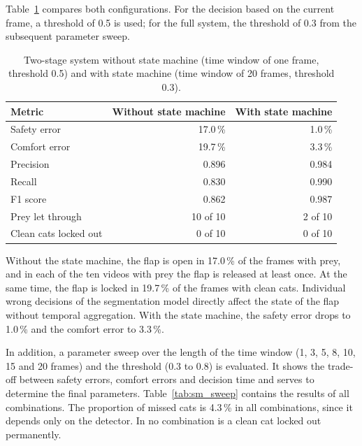 Table~\ref{tab:sm_ablation} compares both configurations. For the decision based on the current frame, a threshold of 0.5 is used; for the full system, the threshold of 0.3 from the subsequent parameter sweep.

\begin{table}[H]
    \centering
    \begin{tabular}{lrr}
        \toprule
        Metric & Without state machine & With state machine \\
        \midrule
        Safety error & 17.0\,\% & 1.0\,\% \\
        Comfort error & 19.7\,\% & 3.3\,\% \\
        Precision & 0.896 & 0.984 \\
        Recall & 0.830 & 0.990 \\
        F1 score & 0.862 & 0.987 \\
        Prey let through & 10 of 10 & 2 of 10 \\
        Clean cats locked out & 0 of 10 & 0 of 10 \\
        \bottomrule
    \end{tabular}
    \caption{Two-stage system without state machine (time window of one frame, threshold 0.5) and with state machine (time window of 20 frames, threshold 0.3).}
    \label{tab:sm_ablation}
\end{table}

Without the state machine, the flap is open in 17.0\,\% of the frames with prey, and in each of the ten videos with prey the flap is released at least once. At the same time, the flap is locked in 19.7\,\% of the frames with clean cats. Individual wrong decisions of the segmentation model directly affect the state of the flap without temporal aggregation. With the state machine, the safety error drops to 1.0\,\% and the comfort error to 3.3\,\%.

In addition, a parameter sweep over the length of the time window (1, 3, 5, 8, 10, 15 and 20 frames) and the threshold (0.3 to 0.8) is evaluated. It shows the trade-off between safety errors, comfort errors and decision time and serves to determine the final parameters. Table~\ref{tab:sm_sweep} contains the results of all combinations. The proportion of missed cats is 4.3\,\% in all combinations, since it depends only on the detector. In no combination is a clean cat locked out permanently.

